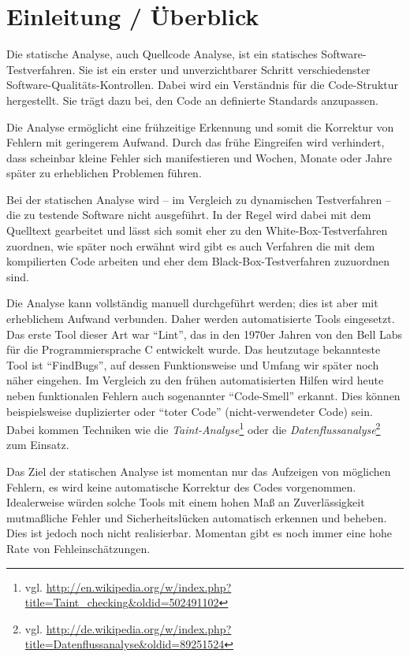 \section{Einleitung / \"Uberblick}
Die statische Analyse, auch Quellcode Analyse, ist ein statisches Software-Testverfahren. Sie ist ein erster und unverzichtbarer Schritt verschiedenster Software-Qualitäts-Kontrollen. Dabei wird ein Verständnis für die Code-Struktur hergestellt. Sie trägt dazu bei, den Code an definierte Standards anzupassen.

Die Analyse ermöglicht eine frühzeitige Erkennung und somit die Korrektur von Fehlern mit geringerem Aufwand. Durch das frühe Eingreifen wird verhindert, dass scheinbar kleine Fehler sich manifestieren und Wochen, Monate oder Jahre später zu erheblichen Problemen führen.

Bei der statischen Analyse wird -- im Vergleich zu dynamischen Testverfahren -- die zu testende Software nicht ausgeführt. In der Regel wird dabei mit dem Quelltext gearbeitet und lässt sich somit eher zu den White-Box-Testverfahren zuordnen, wie später noch erwähnt wird gibt es auch Verfahren die mit dem kompilierten Code arbeiten und eher dem Black-Box-Testverfahren zuzuordnen sind.

Die Analyse kann vollständig manuell durchgeführt werden; dies ist aber mit erheblichem Aufwand verbunden. Daher werden automatisierte Tools eingesetzt. Das erste Tool dieser Art war ``Lint'', das in den 1970er Jahren von den Bell Labs für die Programmiersprache C entwickelt wurde. Das heutzutage bekannteste Tool ist ``FindBugs'', auf dessen Funktionsweise und Umfang wir später noch näher eingehen. Im Vergleich zu den frühen automatisierten Hilfen wird heute neben funktionalen Fehlern auch sogenannter ``Code-Smell'' erkannt. Dies können beispielsweise duplizierter oder ``toter Code'' (nicht-verwendeter Code) sein. Dabei kommen Techniken wie die \emph{Taint-Analyse}\footnote{vgl. \url{http://en.wikipedia.org/w/index.php?title=Taint_checking&oldid=502491102}} oder die \emph{Datenflussanalyse}\footnote{vgl. \url{http://de.wikipedia.org/w/index.php?title=Datenflussanalyse&oldid=89251524}} zum Einsatz. 

Das Ziel der statischen Analyse ist momentan nur das Aufzeigen von möglichen Fehlern, es wird keine automatische Korrektur des Codes vorgenommen. Idealerweise würden solche Tools mit einem hohen Maß an Zuverlässigkeit mutmaßliche Fehler und Sicherheitslücken automatisch erkennen und beheben. Dies ist jedoch noch nicht realisierbar. Momentan gibt es noch immer eine hohe Rate von Fehleinschätzungen.

